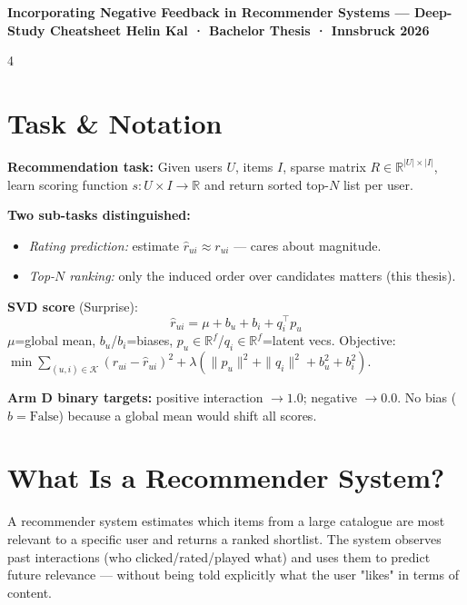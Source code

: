 \documentclass[9pt,a4paper,landscape]{article}
\begin{document}
\pagestyle{empty}

\noindent
\colorbox{arma!80!black}{\parbox{\linewidth}{\centering\color{white}\large\bfseries
  Incorporating Negative Feedback in Recommender Systems — Deep-Study Cheatsheet\quad
  \normalsize Helin Kal · Bachelor Thesis · Innsbruck 2026}}

\vspace{3pt}
\begin{multicols}{4}

\section{Task \& Notation}

\textbf{Recommendation task:} Given users $U$, items $I$, sparse matrix $R\in\mathbb{R}^{|U|\times|I|}$, learn scoring function $s:U\times I\to\mathbb{R}$ and return sorted top-$N$ list per user.

\textbf{Two sub-tasks distinguished:}
\begin{itemize}
  \item \emph{Rating prediction:} estimate $\hat{r}_{ui}\approx r_{ui}$ — cares about magnitude.
  \item \emph{Top-$N$ ranking:} only the induced order over candidates matters (this thesis).
\end{itemize}

\textbf{SVD score} (Surprise):
\[
\hat{r}_{ui} = \mu + b_u + b_i + q_i^\top p_u
\]
$\mu$=global mean, $b_u$/$b_i$=biases, $p_u\in\mathbb{R}^f$/$q_i\in\mathbb{R}^f$=latent vecs.
Objective: $\min\sum_{(u,i)\in\mathcal{K}}(r_{ui}-\hat{r}_{ui})^2+\lambda(\|p_u\|^2+\|q_i\|^2+b_u^2+b_i^2)$.

\textbf{Arm D binary targets:} positive interaction $\to 1.0$; negative $\to 0.0$. No bias ($b=\text{False}$) because a global mean would shift all scores.

\section{What Is a Recommender System?}

A recommender system estimates which items from a large catalogue are most relevant to a specific user and returns a ranked shortlist. The system observes past interactions (who clicked/rated/played what) and uses them to predict future relevance — without being told explicitly what the user "likes" in terms of content.


\end{multicols}
\end{document}
